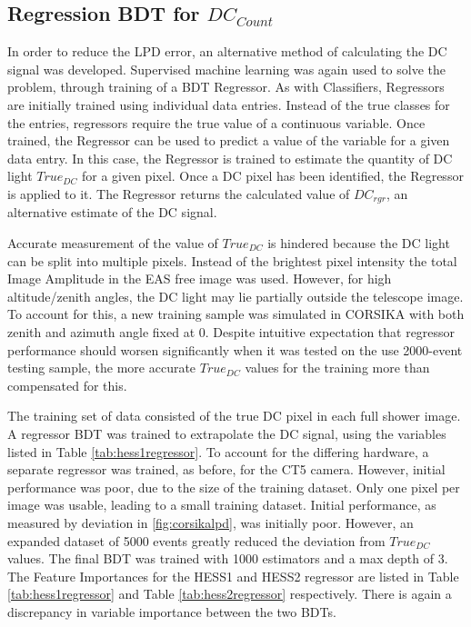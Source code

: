 \documentclass{article}
\begin{document}
\subsection{Regression BDT for $DC_{Count}$}
In order to reduce the LPD error, an alternative method of calculating the DC signal was developed. Supervised machine learning was again used to solve the problem, through training of a BDT Regressor. As with Classifiers, Regressors are initially trained using individual data entries. Instead of the true classes for the entries, regressors require the true value of a continuous variable. Once trained, the Regressor can be used to predict a value of the variable for a given data entry. In this case, the Regressor is trained to estimate the quantity of DC light $True_{DC}$ for a given pixel. Once a DC pixel has been identified, the Regressor is applied to it. The Regressor returns the calculated value of $DC_{rgr}$, an alternative estimate of the DC signal. 

Accurate measurement of the value of $True_{DC}$ is hindered because the DC light can be split into multiple pixels. Instead of the brightest pixel intensity the total Image Amplitude in the EAS free image was used. However, for high altitude/zenith angles, the DC light may lie partially outside the telescope image. To account for this, a new training sample was simulated in CORSIKA with both zenith and azimuth angle fixed at 0. Despite intuitive expectation that regressor performance should worsen significantly when it was tested on the use 2000-event testing sample, the more accurate $True_{DC}$ values for the training more than compensated for this. 

The training set of data consisted of the true DC pixel in each full shower image. A regressor BDT was trained to extrapolate the DC signal, using the variables listed in Table \ref{tab:hess1regressor}. To account for the differing hardware, a separate regressor was trained, as before, for the CT5 camera. However, initial performance was poor, due to the size of the training dataset. Only one pixel per image was usable, leading to a small training dataset. Initial performance, as measured by deviation in \ref{fig:corsikalpd}, was initially poor. However, an expanded dataset of 5000 events greatly reduced the deviation from $True_{DC}$ values. The final BDT was trained with 1000 estimators and a max depth of 3. The Feature Importances for the HESS1 and HESS2 regressor are listed in Table \ref{tab:hess1regressor} and Table \ref{tab:hess2regressor} respectively. There is again a discrepancy in variable importance between the two BDTs.
\end{document}

